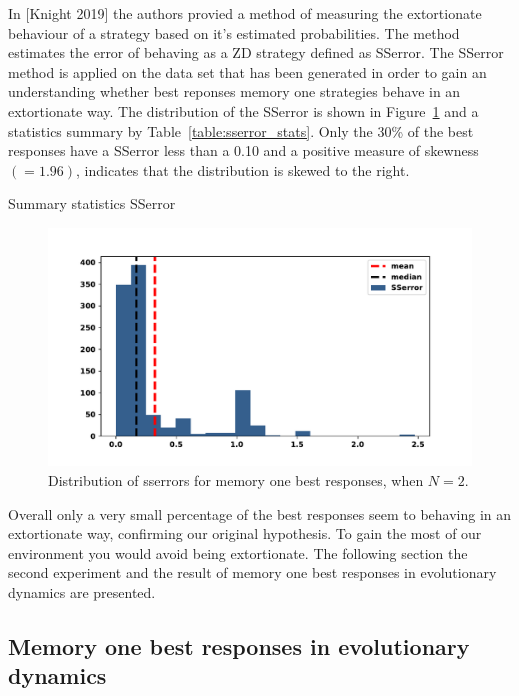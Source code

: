 \documentclass[10pt]{article}
\begin{document}
\begin{minipage}{0.65\linewidth}
In [Knight 2019] the authors provied a method of measuring the extortionate behaviour of a
strategy based on it's estimated probabilities. The method estimates the error of
behaving as a ZD strategy defined as SSerror. The SSerror method is applied on the
data set that has been generated in order to gain an understanding whether best
reponses memory one strategies behave in an extortionate way.
The distribution of the SSerror is shown in Figure~\ref{fig:sserror_mem_one} and
a statistics summary by Table~\ref{table:sserror_stats}. Only the 30\% of the
best responses have a SSerror less than a 0.10 and a positive measure of skewness
\((=1.96)\), indicates that the distribution is skewed to the right.
\end{minipage}
\begin{minipage}{0.39\textwidth}
    \centering
    \captionsetup{type=table}
    \resizebox{.4\columnwidth}{!}{%
        }
        \caption{Summary statistics SSerror}
        \label{table:sserror_stats}
\end{minipage}


\begin{figure}
    \begin{center}
    \includegraphics[width=.6\linewidth]{img/best_respones_sserror.pdf}
    \end{center}
    \caption{Distribution of sserrors for memory one best responses, when \(N=2\).}
    \label{fig:sserror_mem_one}
\end{figure}

Overall only a very small percentage of the best responses seem to behaving in
an extortionate way, confirming our original hypothesis. To gain the most of our
environment you would avoid being extortionate. The following section the second
experiment and the result of memory one best responses in evolutionary dynamics
are presented.

\newpage

\subsection{Memory one best responses in evolutionary dynamics}
\end{document}
